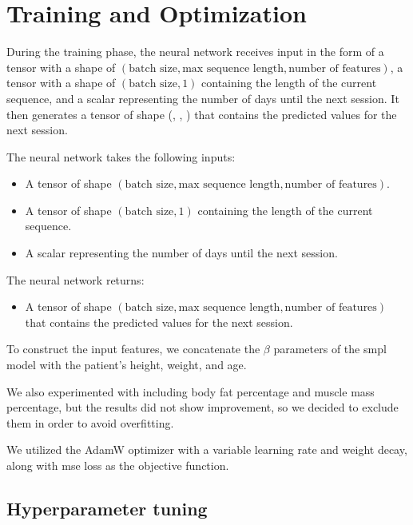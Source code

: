 \section{Training and Optimization}

During the training phase, the neural network receives input in the form of a
tensor with a shape of $(\text{batch size}, \text{max sequence length},
    \text{number of features})$, a tensor with a shape of $(\text{batch size}, 1)$
containing the length of the current sequence, and a scalar representing the
number of days until the next session. It then generates a tensor of shape
(, , ) that
contains the predicted values for the next session.

The neural network takes the following inputs:

\begin{itemize}
    \item A tensor of shape $(\text{batch size}, \text{max sequence length}, \text{number
                  of features})$.
    \item A tensor of shape $(\text{batch size}, 1)$ containing the length of the current
          sequence.
    \item A scalar representing the number of days until the next session.
\end{itemize}

The neural network returns:

\begin{itemize}
    \item A tensor of shape $(\text{batch size}, \text{max sequence length}, \text{number
                  of features})$ that contains the predicted values for the next session.
\end{itemize}

To construct the input features, we concatenate the $\beta$ parameters of the
\gls{smpl} model with the patient's height, weight, and age.

We also experimented with including body fat percentage and muscle mass
percentage, but the results did not show improvement, so we decided to exclude
them in order to avoid overfitting.

We utilized the AdamW optimizer with a variable learning rate and weight decay,
along with \gls{mse} loss as the objective function.

\subsection{Hyperparameter tuning}

